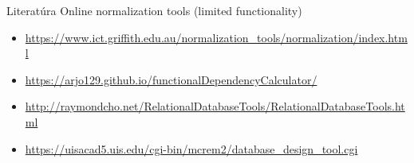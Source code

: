 \documentclass[12pt]{beamer}
\begin{document}
\begin{frame}{Literatúra}
Online normalization tools (limited functionality)
\begin{itemize}
\item {\scriptsize\url{https://www.ict.griffith.edu.au/normalization_tools/normalization/index.html}}
\item {\scriptsize\url{https://arjo129.github.io/functionalDependencyCalculator/}}
\item {\scriptsize\url{http://raymondcho.net/RelationalDatabaseTools/RelationalDatabaseTools.html}}
\item {\scriptsize\url{https://uisacad5.uis.edu/cgi-bin/mcrem2/database_design_tool.cgi}}
\end{itemize}
\end{frame}
\end{document}
